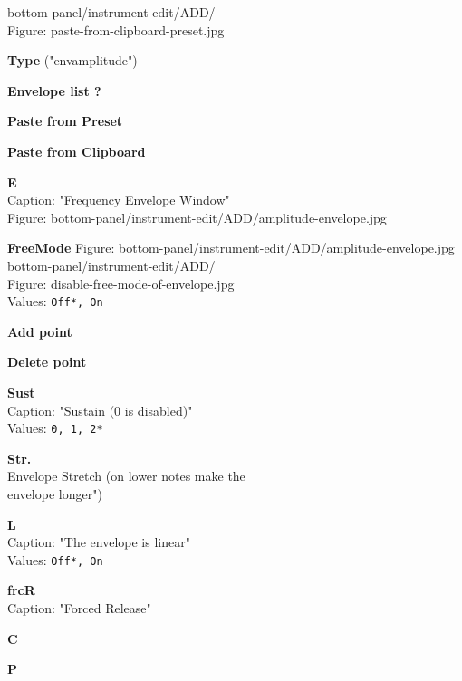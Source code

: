 \documentclass[
 11pt,
 twoside,
 a4paper,
 headinclude,
 footinclude,
 final                                 %
]{article}
\begin{document}
\begin{enumber}
\begin{enumber}
\begin{enumber}
\begin{enumber}
\begin{enumber}
                  bottom-panel/instrument-edit/ADD/ \\
                     Figure: paste-from-clipboard-preset.jpg
                  \begin{enumber}
                     \item \textbf{Type} ("envamplitude")
                     \item \textbf{Envelope list ?}
                     \item \textbf{Paste from Preset}
                     \item \textbf{Paste from Clipboard}
                  \end{enumber}
               \item \textbf{E} \\
                  Caption: "Frequency Envelope Window" \\
                  Figure: bottom-panel/instrument-edit/ADD/amplitude-envelope.jpg
                  \begin{enumber}
                     \item \textbf{FreeMode}
                  Figure: bottom-panel/instrument-edit/ADD/amplitude-envelope.jpg \\
                        bottom-panel/instrument-edit/ADD/ \\
                           Figure: disable-free-mode-of-envelope.jpg \\
                        Values: \texttt{Off*, On}
                     \begin{enumber}
                        \item \textbf{Add point}
                        \item \textbf{Delete point}
                        \item \textbf{Sust} \\
                           Caption: "Sustain (0 is disabled)" \\
                           Values: \texttt{0, 1, 2*}
                        \item \textbf{Str.} \\
                           Envelope Stretch (on lower notes make the \\
                              envelope longer")
                        \item \textbf{L} \\
                           Caption: "The envelope is linear" \\
                           Values: \texttt{Off*, On}
                        \item \textbf{frcR} \\
                           Caption: "Forced Release"
                     \end{enumber}
                     \item \textbf{C}
                     \item \textbf{P}
                  \end{enumber}
            \end{enumber}


\end{enumber}
\end{enumber}
\end{enumber}
\end{enumber}
\end{document}
